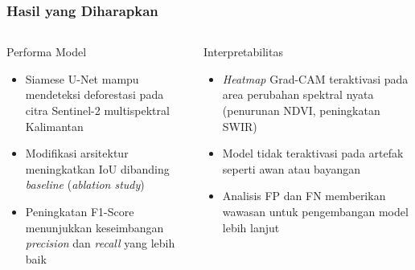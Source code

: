 \documentclass{beamer}
\begin{document}
	\begin{frame}[allowframebreaks]
		\frametitle{Hasil yang Diharapkan}
		
		\begin{columns}[T, onlytextwidth]
			
			\begin{block}{Performa Model}
				\small
				\begin{itemize}
					\item Siamese U-Net mampu mendeteksi 
					deforestasi pada citra Sentinel-2 
					multispektral Kalimantan
					\item Modifikasi arsitektur meningkatkan 
					IoU dibanding \textit{baseline}
					(\textit{ablation study})
					\item Peningkatan F1-Score menunjukkan 
					keseimbangan \textit{precision} 
					dan \textit{recall} yang lebih baik
				\end{itemize}
			\end{block}
			
			\begin{block}{Interpretabilitas}
				\small
				\begin{itemize}
					\item \textit{Heatmap} Grad-CAM 
					teraktivasi pada area perubahan 
					spektral nyata (penurunan NDVI, 
					peningkatan SWIR)
					\item Model tidak teraktivasi pada 
					artefak seperti awan atau 
					bayangan
					\item Analisis FP dan FN memberikan 
					wawasan untuk pengembangan 
					model lebih lanjut
				\end{itemize}
			\end{block}
			
		\end{columns}	
	\end{frame}
	
	
\end{document}
